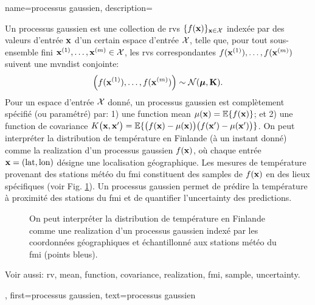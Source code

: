 {name={processus gaussien},
	description={Un  processus gaussien est une collection de \glspl{rv} 
		$\{f({\bf x})\}_{{\bf x} \in \mathcal{X}}$ indexée par des valeurs d’entrée ${\bf x}$ 
		d’un certain espace d’entrée $\mathcal{X}$, telle que, pour tout sous-ensemble fini 
		${\bf x}^{(1)}, \ldots, {\bf x}^{(m)} \in \mathcal{X}$, 
		les \glspl{rv} correspondantes $f({\bf x}^{(1)}), \ldots, f({\bf x}^{(m)})$ suivent une \gls{mvndist} conjointe:
		\[
		\left( f({\bf x}^{(1)}), \ldots, f({\bf x}^{(m)}) \right) \sim \mathcal{N}(\boldsymbol{\mu}, \mathbf{K}).
		\]
		Pour un espace d’entrée $\mathcal{X}$ donné, un processus gaussien est complètement spécifié (ou paramétré) par: 1) une \gls{function} \gls{mean} $\mu({\bf x}) = \mathbb{E}\{ f({\bf x})\}$; et 2) une \gls{function} de \gls{covariance} $K\big({\bf x},{\bf x}'\big) = \mathbb{E}\{ \big(f({\bf x})-\mu({\bf x})\big) \big(f({\bf x}')-\mu({\bf x}')\big) \}$.
		 On peut interpréter la distribution de température en Finlande (à un instant donné) 
		comme la \gls{realization} d’un processus gaussien $f({\bf x})$, où chaque entrée ${\bf x} = (\text{lat}, \text{lon})$ 
		désigne une localisation géographique. Les mesures de température provenant des stations météo du \gls{fmi} 
		constituent des \glspl{sample} de $f({\bf x})$ en des lieux spécifiques (voir Fig. \ref{fig_gp_FMI_dict}). 
		Un processus gaussien permet de prédire la température à proximité des stations du \gls{fmi} et de quantifier l’\gls{uncertainty} 
		des \glspl{prediction}. 
		\begin{figure}[H]
			\begin{center}
				\vspace*{-15mm}
			\end{center}
			\caption{On peut interpréter la distribution de température en Finlande comme une \gls{realization} 
				d’un processus gaussien indexé par les coordonnées géographiques et échantillonné aux stations météo du \gls{fmi} (points bleus). \label{fig_gp_FMI_dict}}
		\end{figure}
		Voir aussi: \gls{rv}, \gls{mean}, \gls{function}, \gls{covariance}, \gls{realization}, \gls{fmi}, \gls{sample}, \gls{uncertainty}.}, 
	first={processus gaussien}, 
	text={processus gaussien}
}

